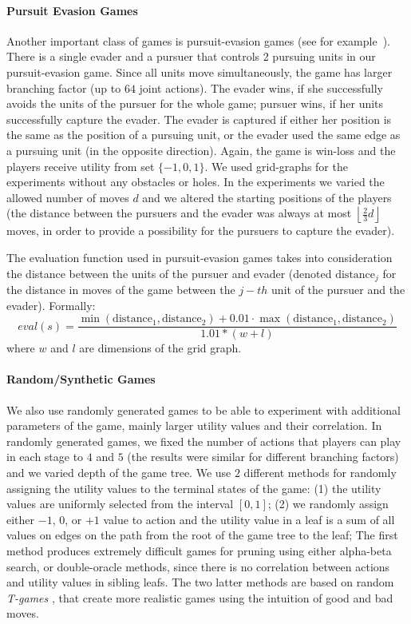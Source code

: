 \paragraph{\textbf{Pursuit Evasion Games}}
Another important class of games is pursuit-evasion games (see for example~\cite{nguyen2013monte}).
There is a single evader and a pursuer that controls 2 pursuing units in our pursuit-evasion game. 
Since all units move simultaneously, the game has larger branching factor (up to $64$ joint actions).
The evader wins, if she successfully avoids the units of the pursuer for the whole game; pursuer wins, if her units successfully capture the evader. The evader is captured if either her position is the same as the position of a pursuing unit, or the evader used the same edge as a pursuing unit (in the opposite direction). 
Again, the game is win-loss and the players receive utility from set $\lbrace -1, 0, 1 \rbrace$.
We used grid-graphs for the experiments without any obstacles or holes.
In the experiments we varied the allowed number of moves $d$ and we altered the starting positions of the players (the distance between the pursuers and the evader was always at most $\left\lfloor\frac{2}{3} d\right\rfloor$ moves, in order to provide a possibility for the pursuers to capture the evader).

The evaluation function used in pursuit-evasion games takes into consideration the distance between the units of the pursuer and evader (denoted $\textrm{distance}_j$ for the distance in moves of the game between the $j-th$ unit of the pursuer and the evader). Formally:
$$
eval(s) = \frac{\min(\textrm{distance}_1,\textrm{distance}_2) + 0.01\cdot\max(\textrm{distance}_1,\textrm{distance}_2)}{1.01*(w+l)}
$$
where $w$ and $l$ are dimensions of the grid graph.

\paragraph{\textbf{Random/Synthetic Games}}
We also use randomly generated games to be able to experiment with additional parameters of the game, mainly larger utility values and their correlation.
In randomly generated games, we fixed the number of actions that players can play in each stage to $4$ and $5$ (the results were similar for different branching factors) and we varied depth of the game tree. 
We use $2$ different methods for randomly assigning the utility values to the terminal states of the game: 
(1) the utility values are uniformly selected from the interval $\left[0,1\right]$; 
(2) we randomly assign either $-1$, $0$, or $+1$ value to action and the utility value in a leaf is a sum of all values on edges on the path from the root of the game tree to the leaf; 
The first method produces extremely difficult games for pruning using either alpha-beta search, or double-oracle methods, since there is no correlation between actions and utility values in sibling leafs. 
The two latter methods are based on random \emph{T-games} \cite{smith1995}, that create more realistic games using the intuition of good and bad moves.

